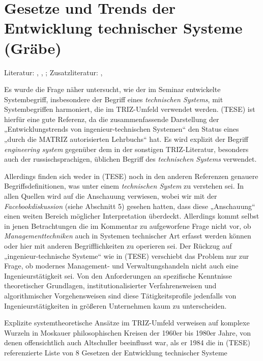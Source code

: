 \documentclass[11pt,a4paper]{article}
\begin{document}
\section{Gesetze und Trends der Entwicklung technischer Systeme
  (Gräbe)} 

Literatur: \cite{Goldovsky1983}, \cite{Graebe2019}, \cite{Rubin2019};
Zusatzliteratur: \cite{TESE2018}, \cite{Ropohl2009}

Es wurde die Frage näher untersucht, wie der im Seminar entwickelte
Systembegriff, insbesondere der Begriff eines \emph{technischen Systems}, mit
Systembegriffen harmoniert, die im TRIZ-Umfeld verwendet werden. (TESE) ist
hierfür eine gute Referenz, da die zusammenfassende Darstellung der
„Entwicklungstrends von ingenieur-technischen Systemen“ den Status eines
„durch die MATRIZ autorisierten Lehrbuchs“ hat. Es wird explizit der Begriff
\emph{engineering system} gegenüber dem in der sonstigen TRIZ-Literatur,
besonders auch der russischsprachigen, üblichen Begriff des \emph{technischen
  Systems} verwendet.

Allerdings finden sich weder in (TESE) noch in den anderen Referenzen genauere
Begriffsdefinitionen, was unter einem \emph{technischen System} zu verstehen
sei. In allen Quellen wird auf die Anschauung verwiesen, wobei wir mit der
\emph{Facebookdiskussion} (siehe Abschnitt 5) gesehen hatten, dass diese
„Anschauung“ einen weiten Bereich möglicher Interpretation überdeckt.
Allerdings kommt selbst in jenen Betrachtungen die im Kommentar zu
\cite{Mann2019} aufgeworfene Frage nicht vor, ob \emph{Managementtechniken}
auch in Systemen technischer Art erfasst werden können oder hier mit anderen
Begriff\-lichkeiten zu operieren sei.  Der Rückzug auf „ingenieur-technische
Systeme“ wie in (TESE) verschiebt das Problem nur zur Frage, ob modernes
Management- und Verwaltungshandeln nicht auch eine Ingenieurstätigkeit sei.
Von den Anforderungen an spezifische Kenntnisse theoretischer Grundlagen,
institutionalisierter Verfahrensweisen und algorithmischer Vorgehensweisen
sind diese Tätigkeitsprofile jedenfalls von Ingenieurstätigkeiten in größeren
Unternehmen kaum zu unterscheiden.

Explizite systemtheoretische Ansätze im TRIZ-Umfeld verweisen auf komplexe
Wurzeln in Moskauer philosophischen Kreisen der 1960er bis 1980er Jahre, von
denen offensichtlich auch Altschuller beeinflusst war, als er 1984 die in
(TESE) referenzierte Liste von 8 Gesetzen der Entwicklung technischer Systeme
\end{document}
